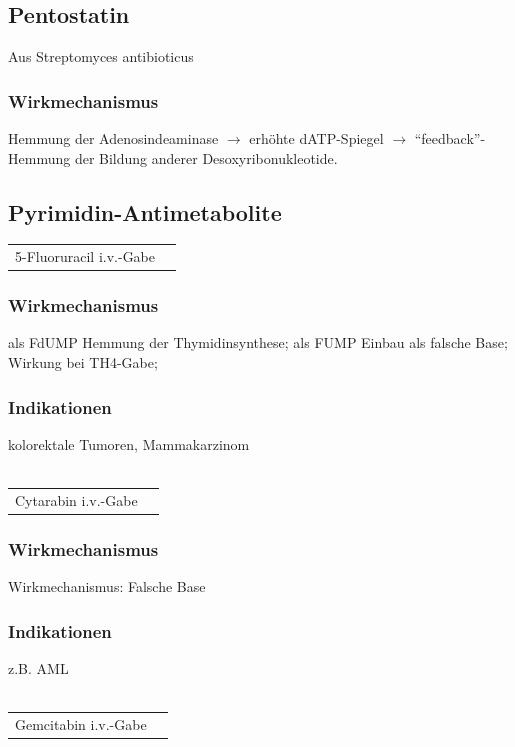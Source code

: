\documentclass[10pt,a4paper]{report}
\begin{document}
\subsection{Pentostatin} %
\label{sub:pentostatin}
Aus Streptomyces antibioticus
\subsubsection{Wirkmechanismus} %
\label{par:wirkmechanismus}
Hemmung der Adenosindeaminase $\rightarrow$ erhöhte dATP-Spiegel $\rightarrow$ “feedback”-Hemmung der Bildung anderer Desoxyribonukleotide.
\subsection{Pyrimidin-Antimetabolite} %
\label{sub:pyrimidin_antimetabolite}
\begin{tabularx}{\textwidth}{XX}
5-Fluoruracil	i.v.-Gabe&\\  
\end{tabularx}
\subsubsection{Wirkmechanismus} %
\label{par:wirkmechanismus}
als FdUMP Hemmung der Thymidinsynthese; als FUMP Einbau als falsche Base; Wirkung bei TH4-Gabe; 
\subsubsection{Indikationen} %
\label{par:indikationen}
kolorektale Tumoren, Mammakarzinom\\ \\
\begin{tabularx}{\textwidth}{XX}
Cytarabin    i.v.-Gabe&\\  
\end{tabularx}
\subsubsection{Wirkmechanismus} %
\label{ssub:wirkmechanismus}
Wirkmechanismus: Falsche Base
\subsubsection{Indikationen} %
\label{ssub:indikationen}
z.B. AML \\ \\
\begin{tabularx}{\textwidth}{XX}
Gemcitabin    i.v.-Gabe&\\  
\end{tabularx}
\end{document}
